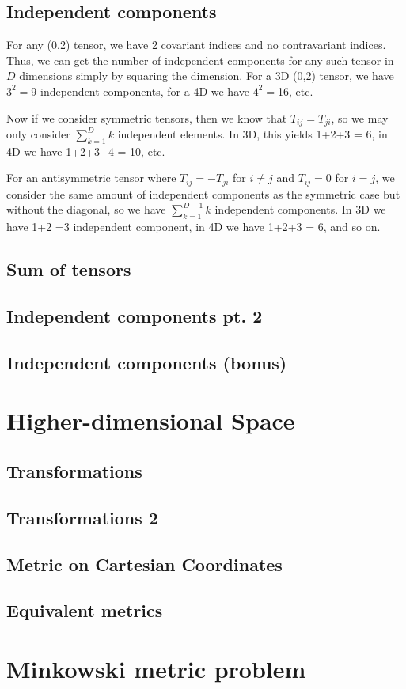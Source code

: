 \documentclass{article}
\begin{document}
		\pagebreak	
		\subsection{Independent components}
			For any (0,2) tensor, we have 2 covariant indices and no contravariant indices. Thus, we can get the number of independent components for any such tensor in $D$ dimensions simply by squaring the dimension. For a 3D (0,2) tensor, we have $3^2=$9 independent components, for a 4D we have $4^2=$16, etc.
			
			Now if we consider symmetric tensors, then we know that $T_{ij} = T_{ji}$, so we may only consider $\sum_{k=1}^{D} k$ independent elements. In 3D, this yields 1+2+3 = 6, in 4D we have 1+2+3+4 = 10, etc.
			
			For an antisymmetric tensor where $T_{ij} = -T_{ji}$ for $i\neq j$ and $T_{ij} = 0$ for $i=j$, we consider the same amount of independent components as the symmetric case but without the diagonal, so we have $\sum_{k=1}^{D-1} k$ independent components. In 3D we have 1+2 =3 independent component, in 4D we have 1+2+3 = 6, and so on.
		\subsection{Sum of tensors}
		\subsection{Independent components pt. 2}
		\subsection{Independent components (bonus)}
	\section{Higher-dimensional Space}
		\subsection{Transformations}
		\subsection{Transformations 2}
		\subsection{Metric on Cartesian Coordinates}
		\subsection{Equivalent metrics}
	\section{Minkowski metric problem}
		
\end{document}
